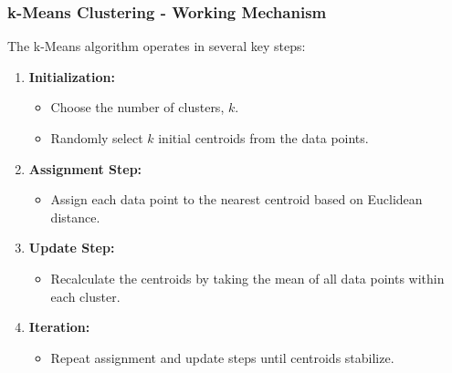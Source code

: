 \documentclass[aspectratio=169]{beamer}
\begin{document}
\begin{frame}[fragile]
    \frametitle{k-Means Clustering - Working Mechanism}
    
    The k-Means algorithm operates in several key steps:
    
    \begin{enumerate}
        \item \textbf{Initialization:}
        \begin{itemize}
            \item Choose the number of clusters, \( k \).
            \item Randomly select \( k \) initial centroids from the data points.
        \end{itemize}
        
        \item \textbf{Assignment Step:}
        \begin{itemize}
            \item Assign each data point to the nearest centroid based on Euclidean distance.
        \end{itemize}
        
        \item \textbf{Update Step:}
        \begin{itemize}
            \item Recalculate the centroids by taking the mean of all data points within each cluster.
        \end{itemize}
        
        \item \textbf{Iteration:} 
        \begin{itemize}
            \item Repeat assignment and update steps until centroids stabilize.
        \end{itemize}
    \end{enumerate}
\end{frame}
\end{document}
